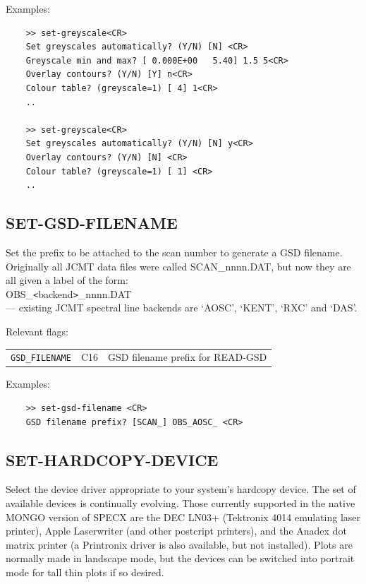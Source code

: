 \documentclass[11pt,twoside]{report}
\begin{document}
Examples:
\begin{verbatim}
    >> set-greyscale<CR>
    Set greyscales automatically? (Y/N) [N] <CR>
    Greyscale min and max? [ 0.000E+00   5.40] 1.5 5<CR>
    Overlay contours? (Y/N) [Y] n<CR>
    Colour table? (greyscale=1) [ 4] 1<CR>
    ..

    >> set-greyscale<CR>
    Set greyscales automatically? (Y/N) [N] y<CR>
    Overlay contours? (Y/N) [N] <CR>
    Colour table? (greyscale=1) [ 1] <CR>
    ..
\end{verbatim}

\subsection{SET-GSD-FILENAME} 

Set the prefix to be attached to the scan number to generate a GSD filename.
Originally all JCMT data files were called SCAN\_nnnn.DAT, but now they are all
given a label of the form:\\
\hspace*{2in} OBS\_\verb+<+backend\verb+>+\_nnnn.DAT \\
 --- existing JCMT spectral line backends are 
`AOSC', `KENT', `RXC' and `DAS'.  
 

Relevant flags:\\
\begin{tabular}{lll}
   \verb+GSD_FILENAME+  & C16 & GSD filename prefix for READ-GSD
\end{tabular}

Examples:
\begin{verbatim}
    >> set-gsd-filename <CR>
    GSD filename prefix? [SCAN_] OBS_AOSC_ <CR>
\end{verbatim}

\subsection{SET-HARDCOPY-DEVICE} 

Select the device driver appropriate to your
system's hardcopy device. The set of available devices is continually evolving.
Those currently supported in the native MONGO version of SPECX are the DEC
LN03+  (Tektronix 4014 emulating laser printer),
Apple Laserwriter (and other  postcript printers), and
the Anadex  dot matrix printer (a Printronix
driver is also available, but not installed). Plots are normally made in
landscape  mode, but the devices can be switched into
portrait mode  for tall thin plots if so desired. 
\end{document}
